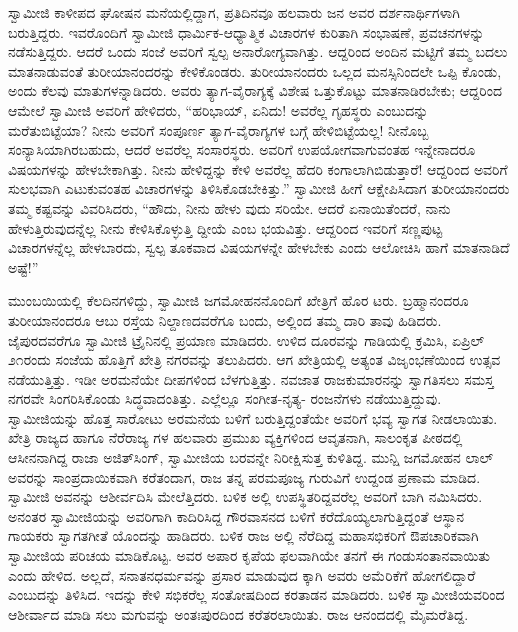 ಸ್ವಾಮೀಜಿ ಕಾಳೀಪದ ಘೋಷನ ಮನೆಯಲ್ಲಿದ್ದಾಗ, ಪ್ರತಿದಿನವೂ ಹಲವಾರು ಜನ ಅವರ ದರ್ಶನಾರ್ಥಿಗಳಾಗಿ ಬರುತ್ತಿದ್ದರು. ಇವರೊಂದಿಗೆ ಸ್ವಾಮೀಜಿ ಧಾರ್ಮಿಕ-ಆಧ್ಯಾತ್ಮಿಕ ವಿಚಾರಗಳ ಕುರಿತಾಗಿ ಸಂಭಾಷಣೆ, ಪ್ರವಚನಗಳನ್ನು ನಡೆಸುತ್ತಿದ್ದರು. ಆದರೆ ಒಂದು ಸಂಜೆ ಅವರಿಗೆ ಸ್ವಲ್ಪ ಅನಾರೋಗ್ಯವಾಗಿತ್ತು. ಆದ್ದರಿಂದ ಅಂದಿನ ಮಟ್ಟಿಗೆ ತಮ್ಮ ಬದಲು ಮಾತನಾಡುವಂತೆ ತುರೀಯಾನಂದರನ್ನು ಕೇಳಿಕೊಂಡರು. ತುರೀಯಾನಂದರು ಒಲ್ಲದ ಮನಸ್ಸಿನಿಂದಲೇ ಒಪ್ಪಿ ಕೊಂಡು, ಅಂದು ಕೆಲವು ಮಾತುಗಳನ್ನಾಡಿದರು. ಅವರು ತ್ಯಾಗ-ವೈರಾಗ್ಯಕ್ಕೆ ವಿಶೇಷ ಒತ್ತುಕೊಟ್ಟು ಮಾತನಾಡಿರಬೇಕು; ಆದ್ದರಿಂದ ಆಮೇಲೆ ಸ್ವಾಮೀಜಿ ಅವರಿಗೆ ಹೇಳಿದರು, “ಹರಿಭಾಯ್, ಏನಿದು! ಅವರೆಲ್ಲ ಗೃಹಸ್ಥರು ಎಂಬುದನ್ನು ಮರೆತುಬಿಟ್ಟೆಯಾ? ನೀನು ಅವರಿಗೆ ಸಂಪೂರ್ಣ ತ್ಯಾಗ-ವೈರಾಗ್ಯಗಳ ಬಗ್ಗೆ ಹೇಳಿಬಿಟ್ಟೆಯಲ್ಲ! ನೀನೊಬ್ಬ ಸಂನ್ಯಾಸಿಯಾಗಿರಬಹುದು, ಆದರೆ ಅವರೆಲ್ಲ ಸಂಸಾರಸ್ಥರು. ಅವರಿಗೆ ಉಪಯೋಗವಾಗುವಂತಹ ಇನ್ನೇನಾದರೂ ವಿಷಯಗಳನ್ನು ಹೇಳಬೇಕಾಗಿತ್ತು. ನೀನು ಹೇಳಿದ್ದನ್ನು ಕೇಳಿ ಅವರೆಲ್ಲ ಹೆದರಿ ಕಂಗಾಲಾಗಿಬಿಡುತ್ತಾರೆ! ಆದ್ದರಿಂದ ಅವರಿಗೆ ಸುಲಭವಾಗಿ ಎಟುಕುವಂತಹ ವಿಚಾರಗಳನ್ನು ತಿಳಿಸಿಕೊಡಬೇಕಿತ್ತು.” ಸ್ವಾಮೀಜಿ ಹೀಗೆ ಆಕ್ಷೇಪಿಸಿದಾಗ ತುರೀಯಾನಂದರು ತಮ್ಮ ಕಷ್ಟವನ್ನು ವಿವರಿಸಿದರು, “ಹೌದು, ನೀನು ಹೇಳು ವುದು ಸರಿಯೇ. ಆದರೆ ಏನಾಯಿತೆಂದರೆ, ನಾನು ಹೇಳುತ್ತಿರುವುದನ್ನೆಲ್ಲ ನೀನು ಕೇಳಿಸಿಕೊಳ್ಳುತ್ತಿ ದ್ದೀಯೆ ಎಂಬ ಭಯವಿತ್ತು. ಆದ್ದರಿಂದ ಇವರಿಗೆ ಸಣ್ಣಪುಟ್ಟ ವಿಚಾರಗಳನ್ನೆಲ್ಲ ಹೇಳಬಾರದು, ಸ್ವಲ್ಪ ತೂಕವಾದ ವಿಷಯಗಳನ್ನೇ ಹೇಳಬೇಕು ಎಂದು ಆಲೋಚಿಸಿ ಹಾಗೆ ಮಾತನಾಡಿದೆ ಅಷ್ಟೆ!”

ಮುಂಬಯಿಯಲ್ಲಿ ಕೆಲದಿನಗಳಿದ್ದು, ಸ್ವಾಮೀಜಿ ಜಗಮೋಹನನೊಂದಿಗೆ ಖೇತ್ರಿಗೆ ಹೊರ ಟರು. ಬ್ರಹ್ಮಾನಂದರೂ ತುರೀಯಾನಂದರೂ ಆಬು ರಸ್ತೆಯ ನಿಲ್ದಾಣದವರೆಗೂ ಬಂದು, ಅಲ್ಲಿಂದ ತಮ್ಮ ದಾರಿ ತಾವು ಹಿಡಿದರು. ಜೈಪುರದವರೆಗೂ ಸ್ವಾಮೀಜಿ ಟ್ರೈನಿನಲ್ಲಿ ಪ್ರಯಾಣ ಮಾಡಿದರು. ಉಳಿದ ದೂರವನ್ನು ಗಾಡಿಯಲ್ಲಿ ಕ್ರಮಿಸಿ, ಏಪ್ರಿಲ್ ೨೧ರಂದು ಸಂಜೆಯ ಹೊತ್ತಿಗೆ ಖೇತ್ರಿ ನಗರವನ್ನು ತಲುಪಿದರು. ಆಗ ಖೇತ್ರಿಯಲ್ಲಿ ಅತ್ಯಂತ ವಿಜೃಂಭಣೆಯಿಂದ ಉತ್ಸವ ನಡೆಯುತ್ತಿತ್ತು. ಇಡೀ ಅರಮನೆಯೇ ದೀಪಗಳಿಂದ ಬೆಳಗುತ್ತಿತ್ತು. ನವಜಾತ ರಾಜಕುಮಾರನನ್ನು ಸ್ವಾಗತಿಸಲು ಸಮಸ್ತ ನಗರವೇ ಸಿಂಗರಿಸಿಕೊಂಡು ಸಿದ್ಧವಾದಂತಿತ್ತು. ಎಲ್ಲೆಲ್ಲೂ ಸಂಗೀತ-ನೃತ್ಯ- ರಂಜನೆಗಳು ನಡೆಯುತ್ತಿದ್ದುವು. ಸ್ವಾಮೀಜಿಯನ್ನು ಹೊತ್ತ ಸಾರೋಟು ಅರಮನೆಯ ಬಳಿಗೆ ಬರುತ್ತಿದ್ದಂತೆಯೇ ಅವರಿಗೆ ಭವ್ಯ ಸ್ವಾಗತ ನೀಡಲಾಯಿತು. ಖೇತ್ರಿ ರಾಜ್ಯದ ಹಾಗೂ ನೆರೆರಾಜ್ಯ ಗಳ ಹಲವಾರು ಪ್ರಮುಖ ವ್ಯಕ್ತಿಗಳಿಂದ ಆವೃತನಾಗಿ, ಸಾಲಂಕೃತ ಪೀಠದಲ್ಲಿ ಆಸೀನನಾಗಿದ್ದ ರಾಜಾ ಅಜಿತ್​ಸಿಂಗ್, ಸ್ವಾಮೀಜಿಯ ಬರವನ್ನೇ ನಿರೀಕ್ಷಿಸುತ್ತ ಕುಳಿತಿದ್ದ. ಮುನ್ಷಿ ಜಗಮೋಹನ ಲಾಲ್ ಅವರನ್ನು ಸಾಂಪ್ರದಾಯಿಕವಾಗಿ ಕರೆತಂದಾಗ, ರಾಜ ತನ್ನ ಪರಮಪೂಜ್ಯ ಗುರುವಿಗೆ ಉದ್ದಂಡ ಪ್ರಣಾಮ ಮಾಡಿದ. ಸ್ವಾಮೀಜಿ ಅವನನ್ನು ಆಶೀರ್ವದಿಸಿ ಮೇಲೆತ್ತಿದರು. ಬಳಿಕ ಅಲ್ಲಿ ಉಪಸ್ಥಿತರಿದ್ದವರೆಲ್ಲ ಅವರಿಗೆ ಬಾಗಿ ನಮಿಸಿದರು. ಅನಂತರ ಸ್ವಾಮೀಜಿಯನ್ನು ಅವರಿಗಾಗಿ ಕಾದಿರಿಸಿದ್ದ ಗೌರವಾಸನದ ಬಳಿಗೆ ಕರೆದೊಯ್ಯಲಾಗುತ್ತಿದ್ದಂತೆ ಆಸ್ಥಾನ ಗಾಯಕರು ಸ್ವಾಗತಗೀತೆ ಯೊಂದನ್ನು ಹಾಡಿದರು. ಬಳಿಕ ರಾಜ ಅಲ್ಲಿ ನೆರೆದಿದ್ದ ಮಹಾಸಭಿಕರಿಗೆ ಔಪಚಾರಿಕವಾಗಿ ಸ್ವಾಮೀಜಿಯ ಪರಿಚಯ ಮಾಡಿಕೊಟ್ಟ. ಅವರ ಅಪಾರ ಕೃಪೆಯ ಫಲವಾಗಿಯೇ ತನಗೆ ಈ ಗಂಡುಸಂತಾನವಾಯಿತು ಎಂದು ಹೇಳಿದ. ಅಲ್ಲದೆ, ಸನಾತನಧರ್ಮವನ್ನು ಪ್ರಸಾರ ಮಾಡುವುದ ಕ್ಕಾಗಿ ಅವರು ಅಮೆರಿಕೆಗೆ ಹೋಗಲಿದ್ದಾರೆ ಎಂಬುದನ್ನು ತಿಳಿಸಿದ. ಇದನ್ನು ಕೇಳಿ ಸಭಿಕರೆಲ್ಲ ಸಂತೋಷದಿಂದ ಕರತಾಡನ ಮಾಡಿದರು. ಬಳಿಕ ಸ್ವಾಮೀಜಿಯವರಿಂದ ಆಶೀರ್ವಾದ ಮಾಡಿ ಸಲು ಮಗುವನ್ನು ಅಂತಃಪುರದಿಂದ ಕರೆತರಲಾಯಿತು. ರಾಜ ಆನಂದದಲ್ಲಿ ಮೈಮರೆತಿದ್ದ.

